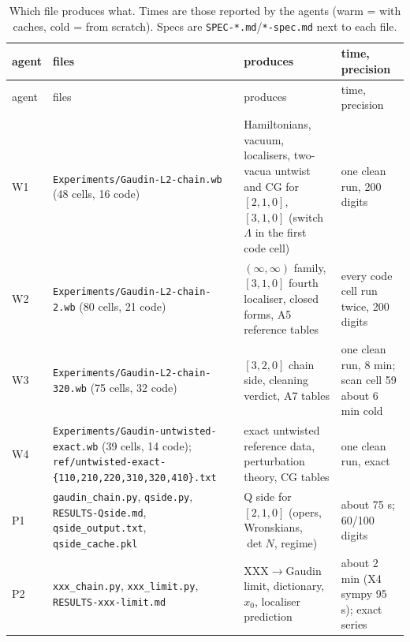 \documentclass[11pt]{article}
\begin{document}
{\footnotesize
\begin{longtable}{p{1.0cm}p{4.2cm}p{4.6cm}p{3.6cm}}
\caption{Which file produces what.
Times are those reported by the agents (warm = with caches, cold = from scratch).
Specs are \texttt{SPEC-\allowbreak{}*.\allowbreak{}md}/\texttt{*-\allowbreak{}spec.\allowbreak{}md} next to each file.}\label{tab:repro}\\
\toprule
agent & files & produces & time, precision \\
\midrule
\endfirsthead
\toprule
agent & files & produces & time, precision \\
\midrule
\endhead
\bottomrule
\endlastfoot
W1 & \texttt{Experiments/\allowbreak{}Gaudin-\allowbreak{}L2-\allowbreak{}chain.\allowbreak{}wb} (48 cells, 16 code) & Hamiltonians, vacuum, localisers, two-vacua untwist and CG for $[2,1,0]$, $[3,1,0]$ (switch $\Lambda$ in the first code cell) & one clean run, 200 digits \\
W2 & \texttt{Experiments/\allowbreak{}Gaudin-\allowbreak{}L2-\allowbreak{}chain-\allowbreak{}2.\allowbreak{}wb} (80 cells, 21 code) & $(\infty,\infty)$ family, $[3,1,0]$ fourth localiser, closed forms, A5 reference tables & every code cell run twice, 200 digits \\
W3 & \texttt{Experiments/\allowbreak{}Gaudin-\allowbreak{}L2-\allowbreak{}chain-\allowbreak{}320.\allowbreak{}wb} (75 cells, 32 code) & $[3,2,0]$ chain side, cleaning verdict, A7 tables & one clean run, 8 min; scan cell 59 about 6 min cold \\
W4 & \texttt{Experiments/\allowbreak{}Gaudin-\allowbreak{}untwisted-\allowbreak{}exact.\allowbreak{}wb} (39 cells, 14 code); \texttt{ref/\allowbreak{}untwisted-\allowbreak{}exact-\allowbreak{}\{110,210,220,310,320,410\}.\allowbreak{}txt} & exact untwisted reference data, perturbation theory, CG tables & one clean run, exact \\
P1 & \texttt{gaudin\_\allowbreak{}chain.\allowbreak{}py}, \texttt{qside.\allowbreak{}py}, \texttt{RESULTS-\allowbreak{}Qside.\allowbreak{}md}, \texttt{qside\_\allowbreak{}output.\allowbreak{}txt}, \texttt{qside\_\allowbreak{}cache.\allowbreak{}pkl} & Q side for $[2,1,0]$ (opers, Wronskians, $\det N$, regime) & about 75 s; 60/100 digits \\
P2 & \texttt{xxx\_\allowbreak{}chain.\allowbreak{}py}, \texttt{xxx\_\allowbreak{}limit.\allowbreak{}py}, \texttt{RESULTS-\allowbreak{}xxx-\allowbreak{}limit.\allowbreak{}md} & XXX$\to$Gaudin limit, dictionary, $x_0$, localiser prediction & about 2 min (X4 sympy 95 s); exact series \\

\end{longtable}}
\end{document}
